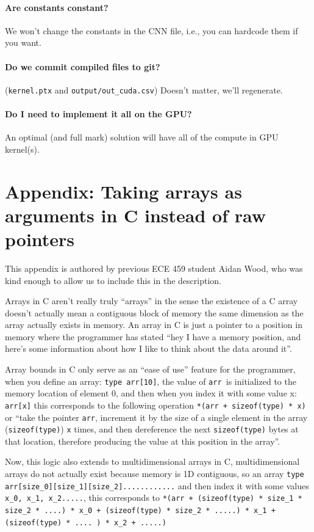 \paragraph{Are constants constant?} We won't change the constants in the CNN file, i.e., you can hardcode them if you want.

\paragraph{Do we commit compiled files to git?} (\verb+kernel.ptx+ and \verb+output/out_cuda.csv+) Doesn't matter, we'll regenerate.

\paragraph{Do I need to implement it all on the GPU?} An optimal (and full mark) solution will have all of the compute in GPU kernel(s).

\newpage
\section*{Appendix: Taking arrays as arguments in C instead of raw pointers}
This appendix is authored by previous ECE 459 student Aidan Wood, who was kind enough to allow us to include this in the description.

Arrays in C aren't really truly ``arrays'' in the sense the existence of a C array doesn't actually mean a contiguous block of memory the same dimension as the array actually exists in memory. An array in C is just a pointer to a position in memory where the programmer has stated ``hey I have a memory position, and here's some information about how I like to think about the data around it''. 

Array bounds in C only serve as an ``ease of use'' feature for the programmer, when you define an array: \texttt{type arr[10]}, the value of \texttt{arr }is initialized to the memory location of element 0, and then when you index it with some value x: \texttt{arr[x]} this corresponds to the following operation \texttt{*(arr + sizeof(type) * x)} or ``take the pointer \texttt{arr}, increment it by the size of a single element in the array (\texttt{sizeof(type)}) \texttt{x} times, and then dereference the next \texttt{sizeof(type)} bytes at that location, therefore producing the value at this position in the array''.

Now, this logic also extends to multidimensional arrays in C, multidimensional arrays do not actually exist because memory is 1D contiguous, so an array \texttt{type arr[size\_0][size\_1][size\_2]............} and then index it with some values \texttt{x\_0, x\_1, x\_2.....}, this corresponds to \texttt{*(arr + (sizeof(type) * size\_1 * size\_2 * ....) * x\_0 + (sizeof(type) * size\_2 * .....) * x\_1 + (sizeof(type) * .... ) * x\_2 + .....)}

